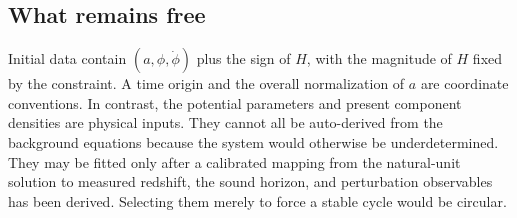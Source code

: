 \subsection{What remains free}
Initial data contain $(a,\phi,\dot\phi)$ plus the sign of $H$, with the magnitude of $H$ fixed by the constraint. A time origin and the overall normalization of $a$ are coordinate conventions. In contrast, the potential parameters and present component densities are physical inputs. They cannot all be auto-derived from the background equations because the system would otherwise be underdetermined. They may be fitted only after a calibrated mapping from the natural-unit solution to measured redshift, the sound horizon, and perturbation observables has been derived. Selecting them merely to force a stable cycle would be circular.
